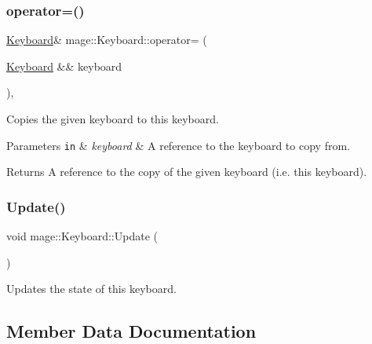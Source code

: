 \subsubsection{\texorpdfstring{operator=()}{operator=()}\hspace{0.1cm}{\footnotesize\ttfamily [2/2]}}
{\footnotesize\ttfamily \hyperlink{classmage_1_1_keyboard}{Keyboard}\& mage\+::\+Keyboard\+::operator= (\begin{DoxyParamCaption}\item[{\hyperlink{classmage_1_1_keyboard}{Keyboard} \&\&}]{keyboard }\end{DoxyParamCaption})\hspace{0.3cm}{\ttfamily [private]}, {\ttfamily [delete]}}

Copies the given keyboard to this keyboard.


\begin{DoxyParams}[1]{Parameters}
\mbox{\tt in}  & {\em keyboard} & A reference to the keyboard to copy from. \\
\hline
\end{DoxyParams}
\begin{DoxyReturn}{Returns}
A reference to the copy of the given keyboard (i.\+e. this keyboard). 
\end{DoxyReturn}
\hypertarget{classmage_1_1_keyboard_abb5fd91a304f8bbf8b15ab1a277dafaf}{}\label{classmage_1_1_keyboard_abb5fd91a304f8bbf8b15ab1a277dafaf} 
\subsubsection{\texorpdfstring{Update()}{Update()}}
{\footnotesize\ttfamily void mage\+::\+Keyboard\+::\+Update (\begin{DoxyParamCaption}{ }\end{DoxyParamCaption})}

Updates the state of this keyboard. 

\subsection{Member Data Documentation}
\hypertarget{classmage_1_1_keyboard_aa7196c689dad6f5aaf35e3929de02791}{}\label{classmage_1_1_keyboard_aa7196c689dad6f5aaf35e3929de02791} 
